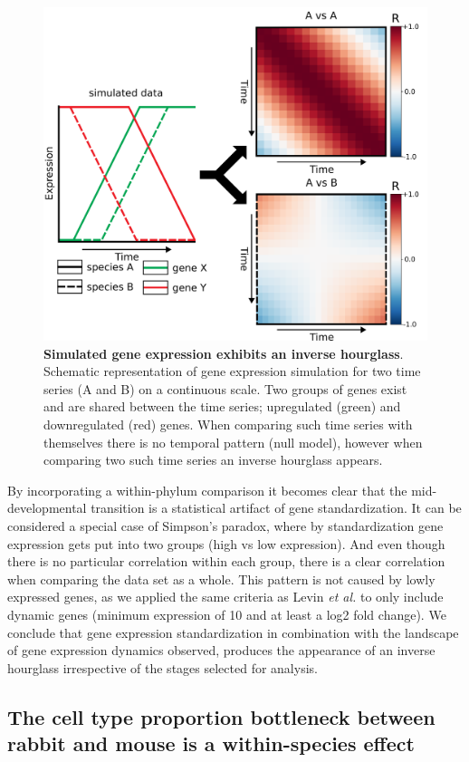 \begin{figure}[H]
    \center
    \includegraphics[width=0.75\linewidth]{ch.hourglass/images/sim_explanation.png}
    \caption{\textbf{Simulated gene expression exhibits an inverse hourglass}. Schematic representation of gene expression simulation for two time series (A and B) on a continuous scale. Two groups of genes exist and are shared between the time series; upregulated (green) and downregulated (red) genes. When comparing such time series with themselves there is no temporal pattern (null model), however when comparing two such time series an inverse hourglass appears. }
    \label{fig:sim_explanation}
\end{figure}

By incorporating a within-phylum comparison it becomes clear that the mid-developmental transition is a statistical artifact of gene standardization. It can be considered a special case of Simpson's paradox, where by standardization gene expression gets put into two groups (high vs low expression). And even though there is no particular correlation within each group, there is a clear correlation when comparing the data set as a whole\cite{Saccenti2023}. This pattern is not caused by lowly expressed genes, as we applied the same criteria as Levin \textit{et al.} to only include dynamic genes (minimum expression of 10 and at least a log2 fold change). We conclude that gene expression standardization in combination with the landscape of gene expression dynamics observed, produces the appearance of an inverse hourglass irrespective of the stages selected for analysis.

\subsection{The cell type proportion bottleneck between rabbit and mouse is a within-species effect} \label{subsection:mayshar}

